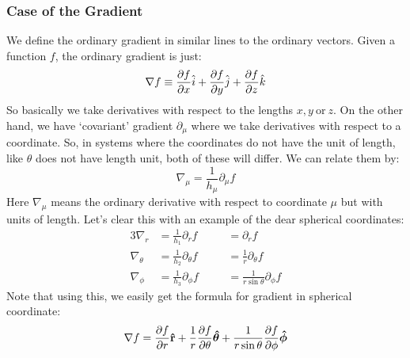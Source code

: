 \subsubsection{Case of the Gradient}
We define the ordinary gradient in similar lines to the ordinary vectors. Given a function $f$, the ordinary gradient is just:
$$\nabla f \equiv \pdv{f}{x}\hat{i}+\pdv{f}{y}\hat{j}+\pdv{f}{z}\hat{k}$$
So basically we take derivatives with respect to the lengths $x,y \ \text{or} \ z$. On the other hand, we have `covariant' gradient $\partial_\mu$ where we take derivatives with respect to a coordinate. So, in systems where the coordinates do not have the unit of length, like $\theta$ does not have length unit, both of these will differ. We can relate them by:
$$\nabla_\mu = \frac{1}{h_\mu}\partial_\mu f$$
Here $\nabla_\mu$ means the ordinary derivative with respect to coordinate $\mu$ but with units of length. Let's clear this with an example of the dear spherical coordinates:
\begin{alignat*}{3}
    \nabla_r      & = \frac{1}{h_1} \partial_r f              &\quad& = \partial_r f \\
    \nabla_\theta & = \frac{1}{h_2} \partial_\theta f         &\quad& = \frac{1}{r} \partial_\theta f \\
    \nabla_\phi   & = \frac{1}{h_3} \partial_\phi f           &\quad& = \frac{1}{r \sin\theta} \partial_\phi f
\end{alignat*}
Note that using this, we easily get the formula for gradient in spherical coordinate:
$$\nabla f = \pdv{f}{r}\boldsymbol{\mathbf{\hat{r}}} +\frac{1}{r} \pdv{f}{\theta} \boldsymbol{\mathbf{\hat{\theta}}}+\frac{1}{r \sin\theta} \pdv{f}{\phi}\boldsymbol{\mathbf{\hat{\phi}}}$$
